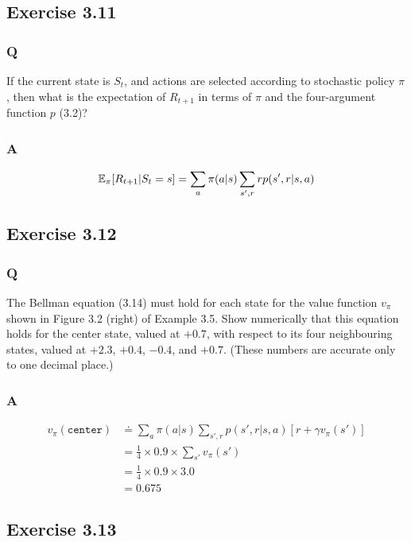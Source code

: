 \subsection{Exercise 3.11}
\subsubsection{Q}
If the current state is $S_t$, and actions are selected according to stochastic policy $\pi$, then what is the expectation of $R_{t+1}$ in terms of $\pi$ and the four-argument function $p$ (3.2)?

\subsubsection{A}
\begin{equation}
    \mathbb{E}_\pi{} [R_{t+1} | S_t = s] = \sum_{a} \pi(a | s) \sum_{s', r} r p(s', r | s, a)
\end{equation}


\subsection{Exercise 3.12}
\subsubsection{Q}
The Bellman equation (3.14) must hold for each state for the value function $v_\pi$ shown in Figure 3.2 (right) of Example 3.5. Show numerically that this equation holds for the center state, valued at $+0.7$, with respect to its four neighbouring states, valued at $+2.3$, $+0.4$, $-0.4$, and $+0.7$. (These numbers are accurate only to one decimal place.)

\subsubsection{A}
\begin{align*}
    v_\pi(\mathtt{center}) &\doteq \sum_a \pi(a | s) \sum_{s', r} p(s', r | s, a)[r + \gamma v_\pi(s')] \\
    & = \frac14 \times 0.9 \times \sum_{s'} v_\pi(s')\\
    & = \frac14 \times 0.9 \times 3.0 \\
    & = 0.675
\end{align*}


\subsection{Exercise 3.13}
